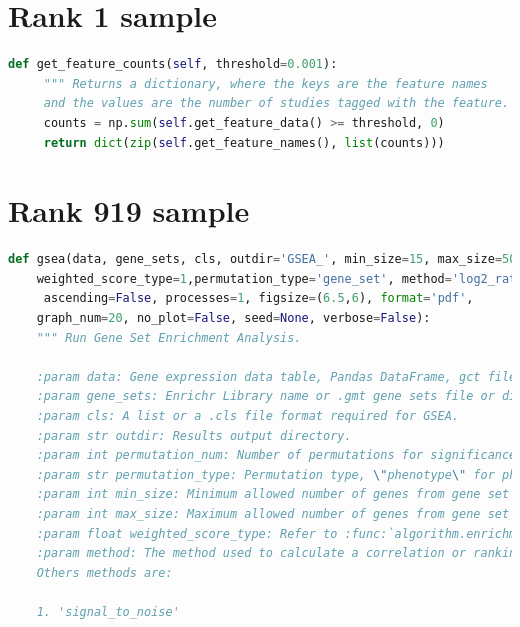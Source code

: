 \documentclass{article}
\begin{document}
\begin{appendices}


\section{Rank 1 sample}
\label{appendix:good}
\begin{lstlisting}[language=Python, caption={Sample that ranked first},captionpos=b]
def get_feature_counts(self, threshold=0.001):
     """ Returns a dictionary, where the keys are the feature names
     and the values are the number of studies tagged with the feature. """
     counts = np.sum(self.get_feature_data() >= threshold, 0)
     return dict(zip(self.get_feature_names(), list(counts)))
\end{lstlisting}

\section{Rank 919 sample}
\label{appendix:bad}
\begin{lstlisting}[language=Python, caption={Sample that ranked last},captionpos=b]
def gsea(data, gene_sets, cls, outdir='GSEA_', min_size=15, max_size=500, permutation_num=1000,
    weighted_score_type=1,permutation_type='gene_set', method='log2_ratio_of_classes',
     ascending=False, processes=1, figsize=(6.5,6), format='pdf',
    graph_num=20, no_plot=False, seed=None, verbose=False):
    """ Run Gene Set Enrichment Analysis.
    
    :param data: Gene expression data table, Pandas DataFrame, gct file.
    :param gene_sets: Enrichr Library name or .gmt gene sets file or dict of gene sets. Same input with GSEA.
    :param cls: A list or a .cls file format required for GSEA.
    :param str outdir: Results output directory.
    :param int permutation_num: Number of permutations for significance computation. Default: 1000.
    :param str permutation_type: Permutation type, \"phenotype\" for phenotypes, \"gene_set\" for genes.
    :param int min_size: Minimum allowed number of genes from gene set also the data set. Default: 15.
    :param int max_size: Maximum allowed number of genes from gene set also the data set. Default: 500.
    :param float weighted_score_type: Refer to :func:`algorithm.enrichment_score`. Default:1.
    :param method: The method used to calculate a correlation or ranking. Default: 'log2_ratio_of_classes'.
    Others methods are:
    
    1. 'signal_to_noise'
    

\end{lstlisting}
\end{appendices}
\end{document}
